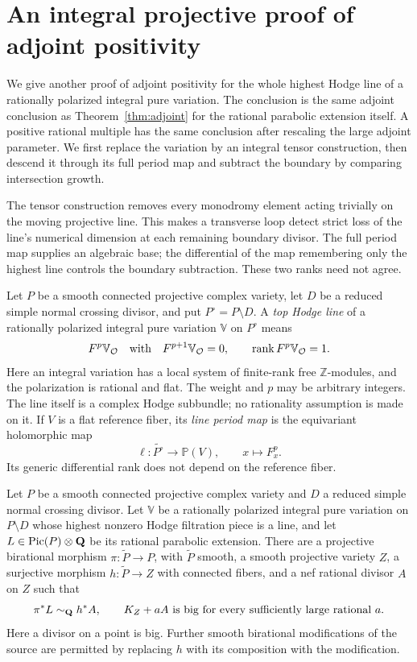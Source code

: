 \section{An integral projective proof of adjoint positivity}
\label{p1logalt:section}

We give another proof of adjoint positivity for the whole highest Hodge
line of a rationally polarized integral pure variation.  The conclusion
is the same adjoint conclusion as Theorem~\ref{thm:adjoint} for the
rational parabolic extension itself. A positive rational multiple
has the same conclusion after rescaling the large adjoint parameter.
We first replace the
variation by an integral tensor construction, then descend it through
its full period map and subtract the boundary by comparing intersection
growth.

The tensor construction removes every monodromy element acting trivially
on the moving projective line.  This makes a transverse loop detect
strict loss of the line's numerical dimension at each remaining boundary
divisor.  The full period map supplies an algebraic base; the differential
of the map remembering only the highest line controls the boundary
subtraction.  These two ranks need not agree.

Let $P$ be a smooth connected projective complex variety, let $D$ be a reduced simple normal crossing
divisor, and put $P^\circ=P\setminus D$.  A \emph{top Hodge line} of a rationally
polarized integral pure variation $\mathbb V$ on $P^\circ$ means
\[
 F^p\mathbb V_{\mathcal O}\quad\text{with}\quad
 F^{p+1}\mathbb V_{\mathcal O}=0,\qquad
 \operatorname{rank} F^p\mathbb V_{\mathcal O}=1.
\]
Here an integral variation has a local system of finite-rank free
$\mathbb Z$-modules, and the polarization is rational and flat.  The
weight and $p$ may be arbitrary integers.  The line itself is a complex
Hodge subbundle; no rationality assumption is made on it.  If $V$ is a flat reference
fiber, its \emph{line period map} is the equivariant holomorphic map
\[
 \ell:\widetilde{P^\circ}\longrightarrow\mathbb P(V),
 \qquad x\longmapsto F^p_x.
\]
Its generic differential rank does not depend on the reference fiber.

\begin{theorem}\label{p1logalt:positivity}
Let $P$ be a smooth connected projective complex variety and $D$ a
reduced simple normal crossing divisor.  Let $\mathbb V$ be a rationally
polarized integral pure variation on $P\setminus D$ whose highest
nonzero Hodge filtration piece is a line, and let
$L\in\operatorname{Pic}(P)\otimes\mathbf Q$ be its rational parabolic extension.  There are a projective birational
morphism $\pi:\widetilde P\to P$, with $\widetilde P$ smooth, a smooth
projective variety $Z$, a surjective morphism $h:\widetilde P\to Z$ with
connected fibers, and a nef rational divisor $A$ on $Z$ such that
\[
 \pi^*L\sim_{\mathbf Q}h^*A,
 \qquad K_Z+aA\ \text{is big for every sufficiently large rational }a.
\]
Here a divisor on a point is big.  Further smooth birational modifications
of the source are permitted by replacing $h$ with its composition with
the modification.
\end{theorem}

